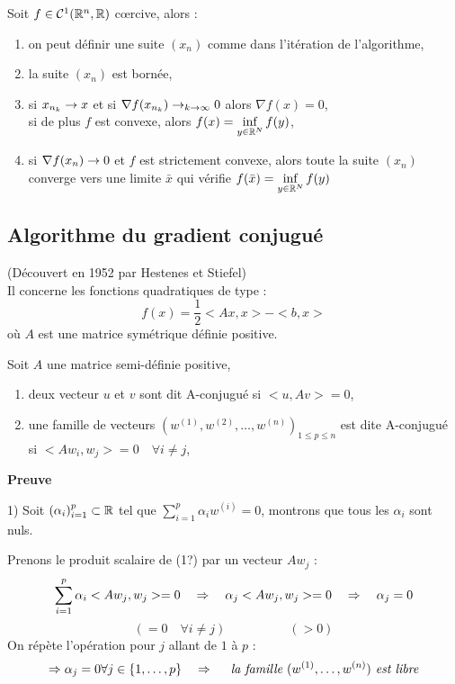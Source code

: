 \begin{theoreme}
Soit $f\in\mathcal{C}^1(\mathbb{R}^n,\mathbb{R})$ c\oe rcive, alors :
\begin{enumerate}
\item on peut définir une suite $(x_n)$ comme dans l'itération de l'algorithme,
\item la suite $(x_n)$ est bornée,
\item si $x_{n_k}\rightarrow x$ et si $\nabla f(x_{n_k})\rightarrow_{k\rightarrow \infty}0$ alors $\nabla f(x)=0$,\\
si de plus $f$ est convexe, alors $\displaystyle f(x)=\inf_{y\in\mathbb{R}^N} f(y)$,
\item si $\nabla f(x_n)\rightarrow 0$ et $f$ est strictement convexe, alors toute la suite $(x_n)$ converge vers une limite $\bar{x}$ qui vérifie $\displaystyle f(\bar{x})=\inf_{y\in\mathbb{R}^N} f(y)$
\end{enumerate}
\end{theoreme}

\subsection{Algorithme du gradient conjugué}
(Découvert en 1952 par Hestenes et Stiefel)\\
Il concerne les fonctions quadratiques de type : \[ f(x)=\frac{1}{2}<Ax,x>-<b,x> \]
où $A$ est une matrice symétrique définie positive.

\begin{definition}
Soit $A$ une matrice semi-définie positive,
\begin{enumerate}
\item deux vecteur $u$ et $v$ sont dit A-conjugué si $<u,Av>=0$,
\item une famille de vecteurs $(w^{(1)},w^{(2)},\dots,w^{(n)})_{1\leq p \leq n}$ est dite A-conjugué \\ si $<Aw_i,w_j>=0 \quad \forall i\ne j$,
\end{enumerate}
\end{definition}

\textbf{Preuve}

1) Soit $\displaystyle (\alpha_i)_{i=1}^p \subset \mathbb{R}$ tel que $\displaystyle \sum_{i=1}^p \alpha_iw^{(i)}=0$, montrons que tous les $\alpha_i$ sont nuls.

Prenons le produit scalaire de (1?) par un vecteur $Aw_j$ : \[ \sum_{i=1}^p \alpha_i<Aw_j,w_j>=0 \quad \Rightarrow \quad \alpha_j<Aw_j,w_j>=0 \quad\Rightarrow\quad \alpha_j=0 \] 
\[ (=0 \quad\forall i\ne j) \quad\quad\quad\quad\quad (>0) \]
On répète l'opération pour $j$ allant de $1$ à $p$ :
\[ \Rightarrow \alpha_j=0 \forall j\in\{1,\dots,p\} \quad\Rightarrow\quad \textit{ la famille } (w^{(1)},\dots,w^{(n)})\textit{ est libre} \]

